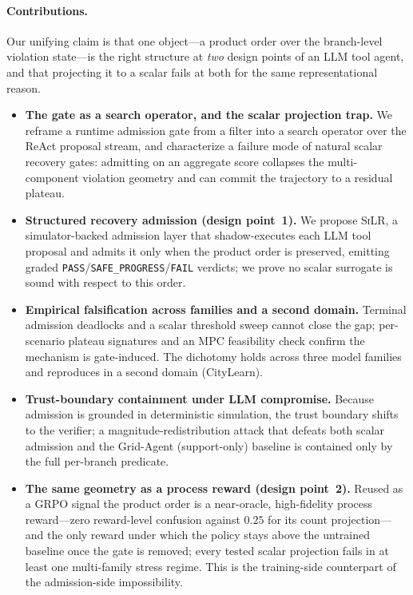 \documentclass[letterpaper]{article} %
\theoremstyle{plain}
\newcommand{\silr}{\textsc{SiLR}}
\begin{document}
\paragraph{Contributions.} Our unifying claim is that one object---a product order over the branch-level violation state---is the right structure at \emph{two} design points of an LLM tool agent, and that projecting it to a scalar fails at both for the same representational reason.
\begin{itemize}\setlength{\itemsep}{1pt}
\item \textbf{The gate as a search operator, and the scalar projection trap.} We reframe a runtime admission gate from a filter into a search operator over the ReAct proposal stream, and characterize a failure mode of natural scalar recovery gates: admitting on an aggregate score collapses the multi-component violation geometry and can commit the trajectory to a residual plateau.
\item \textbf{Structured recovery admission (design point~1).} We propose \silr{}, a simulator-backed admission layer that shadow-executes each LLM tool proposal and admits it only when the product order is preserved, emitting graded \texttt{PASS}/\texttt{SAFE\_PROGRESS}/\texttt{FAIL} verdicts; we prove no scalar surrogate is sound with respect to this order.
\item \textbf{Empirical falsification across families and a second domain.} Terminal admission deadlocks and a scalar threshold sweep cannot close the gap; per-scenario plateau signatures and an MPC feasibility check confirm the mechanism is gate-induced. The dichotomy holds across three model families and reproduces in a second domain (CityLearn).
\item \textbf{Trust-boundary containment under LLM compromise.} Because admission is grounded in deterministic simulation, the trust boundary shifts to the verifier; a magnitude-redistribution attack that defeats both scalar admission and the Grid-Agent (support-only) baseline is contained only by the full per-branch predicate.
\item \textbf{The same geometry as a process reward (design point~2).} Reused as a GRPO signal the product order is a near-oracle, high-fidelity process reward---zero reward-level confusion against $0.25$ for its count projection---and the only reward under which the policy stays above the untrained baseline once the gate is removed; every tested scalar projection fails in at least one multi-family stress regime. This is the training-side counterpart of the admission-side impossibility.
\end{itemize}
\end{document}
